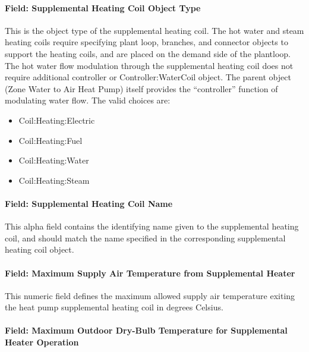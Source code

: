 \paragraph{Field: Supplemental Heating Coil Object Type}\label{field-supplemental-heating-coil-object-type-1-000}

This is the object type of the supplemental heating coil. The hot water and steam heating coils require specifying plant loop, branches, and connector objects to support the heating coils, and are placed on the demand side of the plantloop. The hot water flow modulation through the supplemental heating coil does not require additional controller or Controller:WaterCoil object. The parent object (Zone Water to Air Heat Pump) itself provides the ``controller'' function of modulating water flow. The valid choices are:

\begin{itemize}
\item
  Coil:Heating:Electric
\item
  Coil:Heating:Fuel
\item
  Coil:Heating:Water
\item
  Coil:Heating:Steam
\end{itemize}

\paragraph{Field: Supplemental Heating Coil Name}\label{field-supplemental-heating-coil-name-1-000}

This alpha field contains the identifying name given to the supplemental heating coil, and should match the name specified in the corresponding supplemental heating coil object.

\paragraph{Field: Maximum Supply Air Temperature from Supplemental Heater}\label{field-maximum-supply-air-temperature-from-supplemental-heater-1-000}

This numeric field defines the maximum allowed supply air temperature exiting the heat pump supplemental heating coil in degrees Celsius.

\paragraph{Field: Maximum Outdoor Dry-Bulb Temperature for Supplemental Heater Operation}\label{field-maximum-outdoor-dry-bulb-temperature-for-supplemental-heater-operation-1-000}

